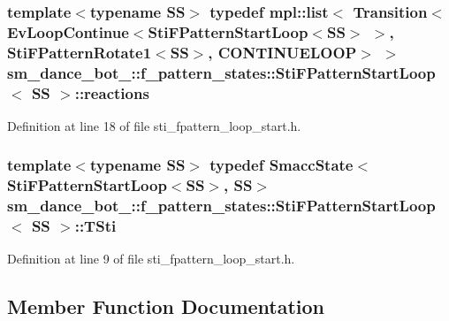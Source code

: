 \subsubsection[{\texorpdfstring{reactions}{reactions}}]{\setlength{\rightskip}{0pt plus 5cm}template$<$typename SS$>$ typedef mpl\+::list$<$ Transition$<$Ev\+Loop\+Continue$<${\bf Sti\+F\+Pattern\+Start\+Loop}$<$SS$>$ $>$, {\bf Sti\+F\+Pattern\+Rotate1}$<$SS$>$, C\+O\+N\+T\+I\+N\+U\+E\+L\+O\+OP$>$ $>$ {\bf sm\+\_\+dance\+\_\+bot\+\_\+::f\+\_\+pattern\+\_\+states\+::\+Sti\+F\+Pattern\+Start\+Loop}$<$ SS $>$\+::{\bf reactions}}\hypertarget{structsm__dance__bot__3_1_1f__pattern__states_1_1StiFPatternStartLoop_a8a5de71794609b0e16f480f8fc674b43}{}\label{structsm__dance__bot__3_1_1f__pattern__states_1_1StiFPatternStartLoop_a8a5de71794609b0e16f480f8fc674b43}


Definition at line 18 of file sti\+\_\+fpattern\+\_\+loop\+\_\+start.\+h.

\subsubsection[{\texorpdfstring{T\+Sti}{TSti}}]{\setlength{\rightskip}{0pt plus 5cm}template$<$typename SS$>$ typedef {\bf Smacc\+State}$<${\bf Sti\+F\+Pattern\+Start\+Loop}$<$SS$>$, SS$>$ {\bf sm\+\_\+dance\+\_\+bot\+\_\+::f\+\_\+pattern\+\_\+states\+::\+Sti\+F\+Pattern\+Start\+Loop}$<$ SS $>$\+::{\bf T\+Sti}}\hypertarget{structsm__dance__bot__3_1_1f__pattern__states_1_1StiFPatternStartLoop_abae524faa7da7b75f61278dd49267206}{}\label{structsm__dance__bot__3_1_1f__pattern__states_1_1StiFPatternStartLoop_abae524faa7da7b75f61278dd49267206}


Definition at line 9 of file sti\+\_\+fpattern\+\_\+loop\+\_\+start.\+h.



\subsection{Member Function Documentation}
